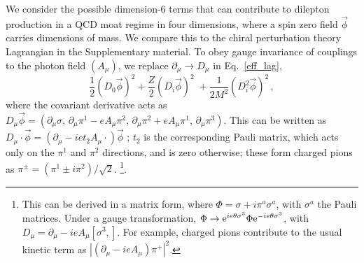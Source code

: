 \documentclass[twocolumn,prd,superscriptaddress, colorlinks, linkcolor=refcol, citecolor=refcol, urlcolor=refcol]{revtex4-2}
\begin{document}
We consider the possible dimension-6 terms that can contribute to dilepton production in a QCD moat regime in four dimensions, where a spin zero field $\vec{\phi}$ carries dimensions of mass. We compare this to the chiral perturbation theory Lagrangian in the Supplementary material.
To obey gauge invariance of couplings to the 
photon field $(A_\mu)$, we replace
$\partial_\mu \rightarrow D_\mu$ in Eq.~\eqref{eff_lag},
%
\begin{equation}
  \frac{1}{2} (D_0 \vec{\phi})^2  + \frac{Z}{2} (D_i \vec{\phi})^2 \;
  + \frac{1}{2 M^2} (D_i^2 \vec{\phi})^2
  \,,
  \label{der_ints1}
\end{equation}
%
% 
where the covariant derivative acts as
$D_\mu\vec\phi =(\partial_\mu\sigma,\,\partial_\mu\pi^1-eA_\mu\pi^2,\,\partial_\mu\pi^2+eA_\mu\pi^1,\,\partial_\mu\pi^3)$.
This can be written as 
$D_\mu \cdot \vec{\phi} = (\partial_\mu  - i e t_2 A_\mu
\cdot ) \vec{\phi}$ ;
$t_2$ is the corresponding Pauli matrix, which acts only on 
the $\pi^1$ and $\pi^2$ directions, and is zero 
otherwise; these form charged pions as
 $\pi^\pm = (\pi^1 \pm i \pi^2)/\sqrt{2}$.
\footnote{
This can be derived in a matrix form, where 
$\Phi = \sigma + i \pi^a \sigma^a$, with $\sigma^a$ the Pauli matrices.
Under a gauge transformation,
$\Phi \rightarrow {\rm e}^{i e \theta \sigma^3} 
\Phi {\rm e}^{- i e \theta \sigma^3}$, 
with $D_\mu = \partial_\mu - i e A_\mu [ \sigma^3, ]$. 
For example, charged pions contribute to the usual kinetic term as
$|(\partial_\mu - i e A_\mu) \pi^+|^2$.
}.
%
\end{document}
